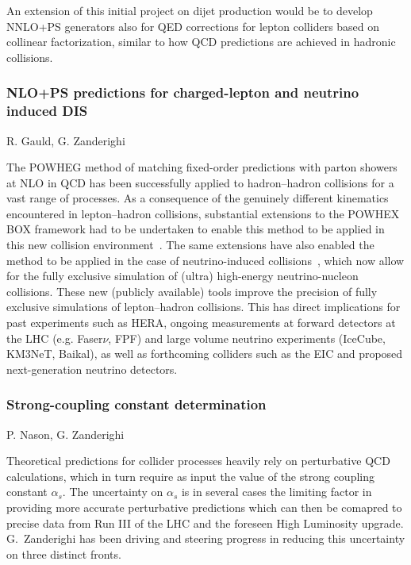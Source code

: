 \documentclass{FBR_Bericht_2025}
\begin{document}
\begin{refsection}
An extension of this initial project on dijet production would be to develop NNLO+PS generators
also for QED corrections for lepton colliders based on collinear factorization, similar to how 
QCD predictions are achieved in hadronic collisions.

\subsubsection{NLO+PS predictions for charged-lepton and neutrino induced DIS}
\begin{Namen}
R. Gauld, G. Zanderighi
\end{Namen}
The POWHEG method of matching fixed-order predictions with parton showers at NLO in QCD has been successfully applied to hadron--hadron collisions for a vast range of processes. As a consequence of the genuinely different kinematics encountered in lepton--hadron collisions, substantial extensions to the POWHEX BOX framework had to be undertaken to enable this method to be applied in this new collision environment~\cite{Banfi:2023mhz}.
The same extensions have also enabled the method to be applied in the case of neutrino-induced collisions~\cite{FerrarioRavasio:2024kem}, which now allow for the fully exclusive simulation of (ultra) high-energy neutrino-nucleon collisions.
These new (publicly available) tools improve the precision of fully exclusive simulations of lepton--hadron collisions. This has direct implications for past experiments such as HERA, ongoing measurements at forward detectors at the LHC (e.g. Faser$\nu$, FPF) and large volume neutrino experiments (IceCube, KM3NeT, Baikal), as well as forthcoming colliders such as the EIC and proposed next-generation neutrino detectors.
%
\subsubsection{Strong-coupling constant determination}
\begin{Namen}
P. Nason, G. Zanderighi
\end{Namen}
%
Theoretical predictions for collider processes heavily rely on
perturbative QCD calculations, which in turn require as input the
value of the strong coupling constant $\alpha_s$. The uncertainty on
$\alpha_s$ is in several cases the limiting factor in providing more
accurate perturbative predictions which can then be comapred to
precise data from Run III of the LHC and the foreseen High Luminosity
upgrade.
%
G.~Zanderighi has been driving and steering progress in reducing this
uncertainty on three distinct fronts.


\end{refsection}
\end{document}
